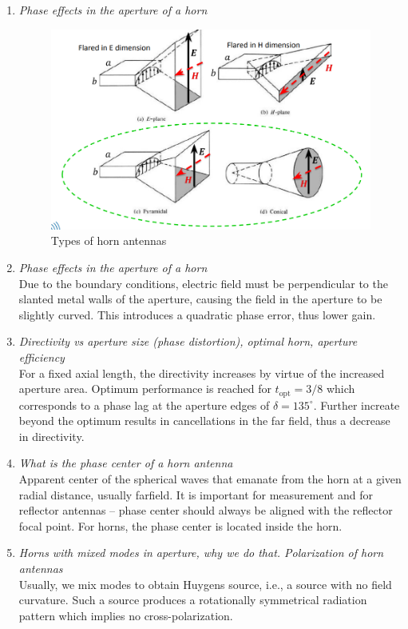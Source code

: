 \documentclass[11pt,a4paper]{article}
\begin{document}
\begin{enumerate}
    \item \emph{Phase effects in the aperture of a horn}
    \begin{figure}[!ht]
        \centering
        \includegraphics[width=.7\textwidth]{src/horn-antennas-types.png}
        \caption{\label{fig:horn-antennas-types}Types of horn antennas}
    \end{figure}
    
    \item \emph{Phase effects in the aperture of a horn}\\
    Due to the boundary conditions, electric field must be perpendicular to the slanted metal walls of the aperture, causing the field in the aperture to be slightly curved. This introduces a quadratic phase error, thus lower gain.

    \item \emph{Directivity vs aperture size (phase distortion), optimal horn, aperture efficiency}\\
    For a fixed axial length, the directivity increases by virtue of the increased aperture area. Optimum performance is reached for $t_{\mathrm{opt}} = 3/8$ which corresponds to a phase lag at the aperture edges of $\delta = 135^\circ$. Further increate beyond the optimum results in cancellations in the far field, thus a decrease in directivity.
    
    \item \emph{What is the phase center of a horn antenna}\\
    Apparent center of the spherical waves that emanate from the horn at a given radial distance, usually farfield. It is important for measurement and for reflector antennas -- phase center should always be aligned with the reflector focal point. For horns, the phase center is located inside the horn.
    
    \item \emph{Horns with mixed modes in aperture, why we do that. Polarization of horn antennas}\\
    Usually, we mix modes to obtain Huygens source, i.e., a source with no field curvature. Such a source produces a rotationally symmetrical radiation pattern which implies no cross-polarization.
    

\end{enumerate}
\end{document}
